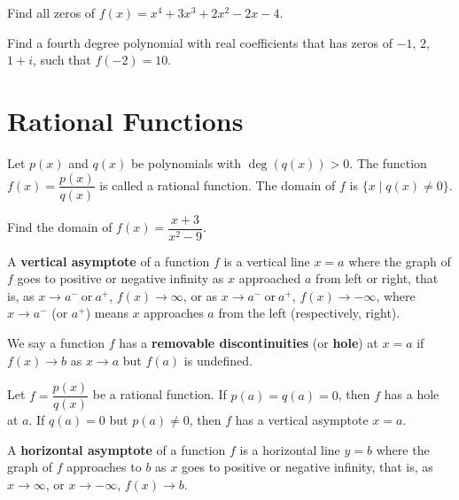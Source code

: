 \begin{exercise}
  Find all zeros of $f(x)=x^4 + 3 x^3 + 2 x^2 - 2 x - 4$.
\end{exercise}


\begin{exercise}
  Find a fourth degree polynomial with real coefficients that has zeros of $-1$, $2$, $1+i$, such that $f(-2)=10$.
\end{exercise}

\newpage

\section{Rational Functions}
\begin{definition}
  Let $p(x)$ and $q(x)$ be polynomials with $\deg(q(x))>0$. The function $f(x)=\dfrac{p(x)}{q(x)}$ is called a rational function. The domain of $f$ is $\{x\mid q(x)\ne 0\}$.
\end{definition}

\begin{example}
  Find the domain of $f(x)=\dfrac{x+3}{x^2-9}$.
\end{example}

\begin{definition}
  A \textbf{vertical asymptote} of a function $f$ is a vertical line $x=a$ where the graph of $f$ goes to positive or negative infinity as $x$ approached $a$ from left or right, that is, as $x\rightarrow a^- ~\text{or}~ a^+$, $f(x)\rightarrow \infty$, or as $x\rightarrow a^- ~\text{or}~ a^+$, $f(x)\rightarrow -\infty$, where $x\to a^-$ (or $a^+$) means $x$ approaches $a$ from the left (respectively, right).

  We say a function $f$ has a \textbf{removable discontinuities} (or \textbf{hole}) at $x=a$ if $f(x)\to b$ as $x\to a$ but $f(a)$ is undefined.
\end{definition}

\begin{proposition}
  Let $f=\dfrac{p(x)}{q(x)}$ be a rational function. If $p(a)=q(a)=0$, then $f$ has a hole at $a$. If $q(a)=0$ but $p(a)\ne 0$, then $f$ has a vertical asymptote $x=a$.
\end{proposition}

\begin{definition}
A \textbf{horizontal asymptote} of a function $f$ is a horizontal line $y=b$ where the graph of $f$ approaches to $b$ as $x$ goes to positive or negative infinity, that is,   
as $x\rightarrow \infty$, or $x\rightarrow -\infty$, $f(x)\rightarrow b$.
\end{definition}

